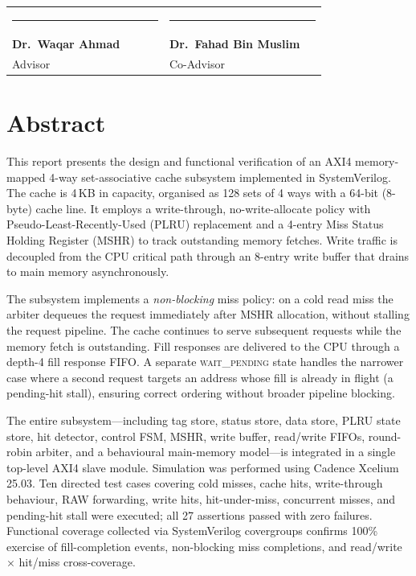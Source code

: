 \documentclass[12pt,letterpaper]{report}
\begin{document}
\vspace{2.5cm}

\noindent\begin{tabular}{@{}p{0.45\linewidth}p{0.45\linewidth}@{}}
\rule{0.40\linewidth}{0.4pt} & \rule{0.40\linewidth}{0.4pt} \\[2pt]
\textbf{Dr.\ Waqar Ahmad}   & \textbf{Dr.\ Fahad Bin Muslim} \\
Advisor                     & Co-Advisor \\
\end{tabular}

\clearpage

\pagestyle{fancy}

\chapter*{Abstract}

This report presents the design and functional verification of an AXI4
memory-mapped 4-way set-associative cache subsystem implemented in
SystemVerilog.  The cache is 4\,KB in capacity, organised as 128 sets
of 4 ways with a 64-bit (8-byte) cache line.  It employs a
write-through, no-write-allocate policy with Pseudo-Least-Recently-Used
(PLRU) replacement and a 4-entry Miss Status Holding Register (MSHR) to
track outstanding memory fetches.  Write traffic is decoupled from the
CPU critical path through an 8-entry write buffer that drains to main
memory asynchronously.

The subsystem implements a \emph{non-blocking} miss policy: on a cold
read miss the arbiter dequeues the request immediately after MSHR
allocation, without stalling the request pipeline.  The cache continues
to serve subsequent requests while the memory fetch is outstanding.
Fill responses are delivered to the CPU through a depth-4 fill response
FIFO.  A separate \textsc{wait\_pending} state handles the narrower case
where a second request targets an address whose fill is already in
flight (a pending-hit stall), ensuring correct ordering without broader
pipeline blocking.

The entire subsystem---including tag store, status store, data store,
PLRU state store, hit detector, control FSM, MSHR, write buffer,
read/write FIFOs, round-robin arbiter, and a behavioural main-memory
model---is integrated in a single top-level AXI4 slave module.
Simulation was performed using Cadence Xcelium 25.03.  Ten directed
test cases covering cold misses, cache hits, write-through behaviour,
RAW forwarding, write hits, hit-under-miss, concurrent misses, and
pending-hit stall were executed; all 27 assertions passed with zero
failures.  Functional coverage collected via SystemVerilog covergroups
confirms 100\% exercise of fill-completion events, non-blocking miss
completions, and read/write $\times$ hit/miss cross-coverage.
\end{document}
